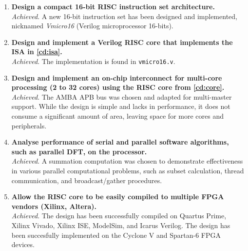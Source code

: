 \begin{enumerate}[leftmargin=2\parindent, label=\bfseries CD\arabic*]
\item{\textbf{Design a compact 16-bit RISC instruction set architecture.}\\
\textit{Achieved}. A new 16-bit instruction set has been designed and implemented, nicknamed \textit{Vmicro16} (Verilog microprocessor 16-bits).
}

\item{\textbf{Design and implement a Verilog RISC core that implements the ISA in \ref{cd:isa}.}\\
\textit{Achieved}. The implementation is found in \verb|vmicro16.v|.
}

\item{\textbf{Design and implement an on-chip interconnect for multi-core processing (2 to 32 cores) using the RISC core from \ref{cd:core}.}\\
\textit{Achieved}. The AMBA APB bus was chosen and adapted for multi-master support. While the design is simple and lacks in performance, it does not consume a significant amount of area, leaving space for more cores and peripherals.
}

\item{\textbf{Analyse performance of serial and parallel software algorithms, such as parallel DFT, on the processor.}\\
\textit{Achieved}. A summation computation was chosen to demonstrate effectiveness in various parallel computational problems, such as subset calculation, thread communication, and broadcast/gather procedures.
}

\item{\textbf{Allow the RISC core to be easily compiled to multiple FPGA vendors (Xilinx, Altera).}\\
\textit{Achieved}. The design has been successfully compiled on Quartus Prime, Xilinx Vivado, Xilinx ISE, ModelSim, and Icarus Verilog. The design has been succesfully implemented on the Cyclone V and Spartan-6 FPGA devices.
}
\end{enumerate}

